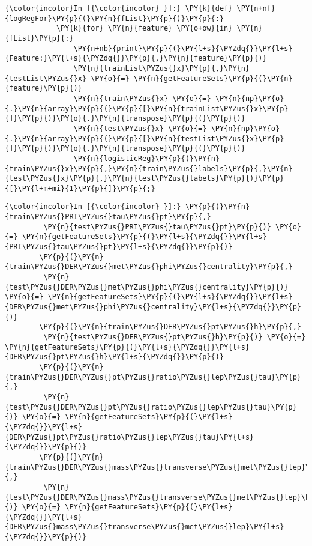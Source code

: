     \begin{Verbatim}[commandchars=\\\{\}]
{\color{incolor}In [{\color{incolor} }]:} \PY{k}{def} \PY{n+nf}{logRegFor}\PY{p}{(}\PY{n}{fList}\PY{p}{)}\PY{p}{:}
            \PY{k}{for} \PY{n}{feature} \PY{o+ow}{in} \PY{n}{fList}\PY{p}{:}
                \PY{n+nb}{print}\PY{p}{(}\PY{l+s}{\PYZdq{}}\PY{l+s}{Feature:}\PY{l+s}{\PYZdq{}}\PY{p}{,}\PY{n}{feature}\PY{p}{)}
                \PY{n}{trainList\PYZus{}x}\PY{p}{,}\PY{n}{testList\PYZus{}x} \PY{o}{=} \PY{n}{getFeatureSets}\PY{p}{(}\PY{n}{feature}\PY{p}{)}
                \PY{n}{train\PYZus{}x} \PY{o}{=} \PY{n}{np}\PY{o}{.}\PY{n}{array}\PY{p}{(}\PY{p}{[}\PY{n}{trainList\PYZus{}x}\PY{p}{]}\PY{p}{)}\PY{o}{.}\PY{n}{transpose}\PY{p}{(}\PY{p}{)}
                \PY{n}{test\PYZus{}x} \PY{o}{=} \PY{n}{np}\PY{o}{.}\PY{n}{array}\PY{p}{(}\PY{p}{[}\PY{n}{testList\PYZus{}x}\PY{p}{]}\PY{p}{)}\PY{o}{.}\PY{n}{transpose}\PY{p}{(}\PY{p}{)}
                \PY{n}{logisticReg}\PY{p}{(}\PY{n}{train\PYZus{}x}\PY{p}{,}\PY{n}{train\PYZus{}labels}\PY{p}{,}\PY{n}{test\PYZus{}x}\PY{p}{,}\PY{n}{test\PYZus{}labels}\PY{p}{)}\PY{p}{[}\PY{l+m+mi}{1}\PY{p}{]}\PY{p}{;}
\end{Verbatim}

    \begin{Verbatim}[commandchars=\\\{\}]
{\color{incolor}In [{\color{incolor} }]:} \PY{p}{(}\PY{n}{train\PYZus{}PRI\PYZus{}tau\PYZus{}pt}\PY{p}{,}
         \PY{n}{test\PYZus{}PRI\PYZus{}tau\PYZus{}pt}\PY{p}{)} \PY{o}{=} \PY{n}{getFeatureSets}\PY{p}{(}\PY{l+s}{\PYZdq{}}\PY{l+s}{PRI\PYZus{}tau\PYZus{}pt}\PY{l+s}{\PYZdq{}}\PY{p}{)}
        \PY{p}{(}\PY{n}{train\PYZus{}DER\PYZus{}met\PYZus{}phi\PYZus{}centrality}\PY{p}{,}
         \PY{n}{test\PYZus{}DER\PYZus{}met\PYZus{}phi\PYZus{}centrality}\PY{p}{)} \PY{o}{=} \PY{n}{getFeatureSets}\PY{p}{(}\PY{l+s}{\PYZdq{}}\PY{l+s}{DER\PYZus{}met\PYZus{}phi\PYZus{}centrality}\PY{l+s}{\PYZdq{}}\PY{p}{)}
        \PY{p}{(}\PY{n}{train\PYZus{}DER\PYZus{}pt\PYZus{}h}\PY{p}{,}
         \PY{n}{test\PYZus{}DER\PYZus{}pt\PYZus{}h}\PY{p}{)} \PY{o}{=} \PY{n}{getFeatureSets}\PY{p}{(}\PY{l+s}{\PYZdq{}}\PY{l+s}{DER\PYZus{}pt\PYZus{}h}\PY{l+s}{\PYZdq{}}\PY{p}{)}
        \PY{p}{(}\PY{n}{train\PYZus{}DER\PYZus{}pt\PYZus{}ratio\PYZus{}lep\PYZus{}tau}\PY{p}{,}
         \PY{n}{test\PYZus{}DER\PYZus{}pt\PYZus{}ratio\PYZus{}lep\PYZus{}tau}\PY{p}{)} \PY{o}{=} \PY{n}{getFeatureSets}\PY{p}{(}\PY{l+s}{\PYZdq{}}\PY{l+s}{DER\PYZus{}pt\PYZus{}ratio\PYZus{}lep\PYZus{}tau}\PY{l+s}{\PYZdq{}}\PY{p}{)}
        \PY{p}{(}\PY{n}{train\PYZus{}DER\PYZus{}mass\PYZus{}transverse\PYZus{}met\PYZus{}lep}\PY{p}{,}
         \PY{n}{test\PYZus{}DER\PYZus{}mass\PYZus{}transverse\PYZus{}met\PYZus{}lep}\PY{p}{)} \PY{o}{=} \PY{n}{getFeatureSets}\PY{p}{(}\PY{l+s}{\PYZdq{}}\PY{l+s}{DER\PYZus{}mass\PYZus{}transverse\PYZus{}met\PYZus{}lep}\PY{l+s}{\PYZdq{}}\PY{p}{)}
\end{Verbatim}

